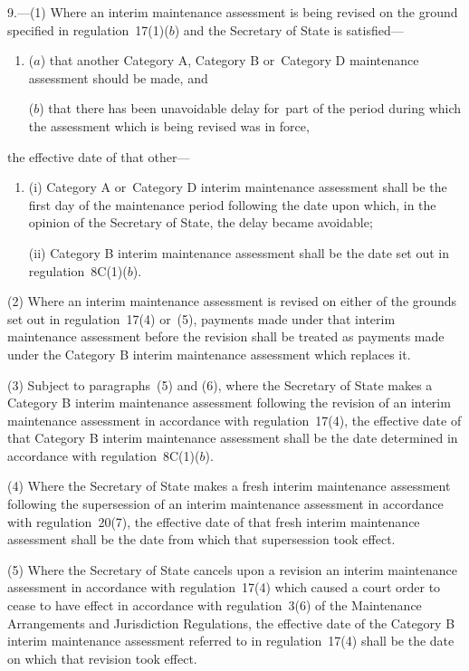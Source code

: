 \documentclass[a4paper,12pt]{article}
\begin{document}
9.—(1) Where an interim maintenance assessment is being revised on the ground specified in regulation~17(1)($b$) and the Secretary of State is satisfied---
\begin{enumerate}\item[]
($a$) that another Category A, Category B or~Category D maintenance assessment should be made, and

($b$) that there has been unavoidable delay for~part of the period during which the assessment which is being revised was in force,
\end{enumerate}
the effective date of that other---
\begin{enumerate}\item[]
(i) Category A or~Category D interim maintenance assessment shall be the first day of the maintenance period following the date upon which, in the opinion of the Secretary of State, the delay became avoidable;

(ii) Category B interim maintenance assessment shall be the date set out in regulation~8C(1)($b$).
\end{enumerate}

(2) Where an interim maintenance assessment is revised on either of the grounds set out in regulation~17(4) or~(5), payments made under that interim maintenance assessment before the revision shall be treated as payments made under the Category B interim maintenance assessment which replaces it.

(3) Subject to paragraphs~(5) and (6), where the Secretary of State makes a Category B interim maintenance assessment following the revision of an interim maintenance assessment in accordance with regulation~17(4), the effective date of that Category B interim maintenance assessment shall be the date determined in accordance with regulation~8C(1)($b$).

(4) Where the Secretary of State makes a fresh interim maintenance assessment following the supersession of an interim maintenance assessment in accordance with regulation~20(7), the effective date of that fresh interim maintenance assessment shall be the date from which that supersession took effect.

(5) Where the Secretary of State cancels upon a revision an interim maintenance assessment in accordance with regulation~17(4) which caused a court order to cease to have effect in accordance with regulation~3(6) of the Maintenance Arrangements and Jurisdiction Regulations, the effective date of the Category B interim maintenance assessment referred to in regulation~17(4) shall be the date on which that revision took effect.
\end{document}
